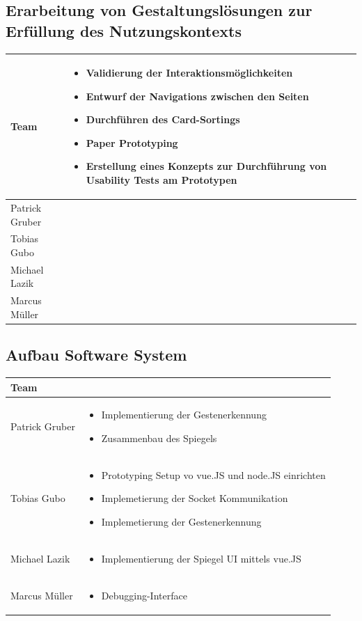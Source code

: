 \documentclass[12pt, a4paper]{scrartcl}
\begin{document}
	\subsection*{Erarbeitung von Gestaltungslösungen zur Erfüllung des Nutzungskontexts}
	\begin{tabularx}{0.95\textwidth}{|l|X|}
		\hline
		Team & \begin{itemize}
			\setlength{\itemsep}{-0.6em}
			\item  Validierung der Interaktionsmöglichkeiten
			\item  Entwurf der Navigations zwischen den Seiten
			\item Durchführen des Card-Sortings
			\item Paper Prototyping
			\item Erstellung eines Konzepts zur Durchführung von Usability Tests am Prototypen
		\end{itemize}\\
		\hline
		Patrick Gruber & \\
		\hline
		Tobias Gubo &  \\
		\hline
		Michael Lazik &  \\
		\hline
		Marcus Müller & \\
		\hline
	\end{tabularx}

	\subsection*{Aufbau Software System}
	\begin{tabularx}{0.95\textwidth}{|l|X|}
		\hline
		Team & \\
		\hline
		Patrick Gruber & 
		\begin{itemize}
			\setlength{\itemsep}{-0.6em}
			\item Implementierung der Gestenerkennung
			\item Zusammenbau des Spiegels
		\end{itemize}\\
		\hline
		Tobias Gubo & \begin{itemize}
			\setlength{\itemsep}{-0.6em}
			\item Prototyping Setup vo vue.JS und node.JS einrichten
			\item Implemetierung der Socket Kommunikation
			\item Implemetierung der Gestenerkennung
		\end{itemize}\\
		\hline
		Michael Lazik & \begin{itemize}
			\setlength{\itemsep}{-0.6em}
			\item Implementierung der Spiegel UI mittels vue.JS
		\end{itemize}\\
		\hline
		Marcus Müller & \begin{itemize}
			\setlength{\itemsep}{-0.6em}
			\item Debugging-Interface 
		\end{itemize} \\
		\hline
	\end{tabularx}
\end{document}
